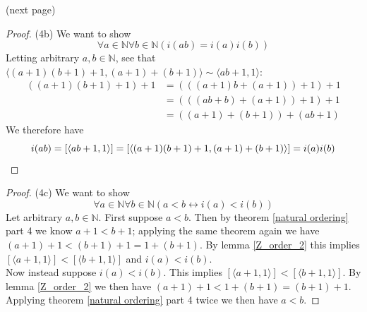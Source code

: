 \documentclass{report}
\begin{document}
\noindent(next page)\newpage
\begin{proof}(4b)
We want to show
\begin{equation*}
\forall a\in\mathbb N\forall b\in\mathbb N(i(ab)=i(a)i(b))
\end{equation*}
Letting arbitrary $a,b\in\mathbb N$,
see that $\langle(a+1)(b+1)+1,(a+1)+(b+1)\rangle\sim\langle ab+1,1\rangle$:
\begin{align*}
((a+1)(b+1)+1)+1&=(((a+1)b+(a+1))+1)+1\\
&=(((ab+b)+(a+1))+1)+1\\
&=((a+1)+(b+1))+(ab+1)
\end{align*}
We therefore have
\begin{equation*}
i(ab)=[\langle ab+1,1\rangle]=[\langle(a+1)(b+1)+1,(a+1)+(b+1)\rangle]=i(a)i(b)\qedhere
\end{equation*}
\end{proof}
\begin{proof}(4c)
We want to show
\begin{equation*}
\forall a\in\mathbb N\forall b\in\mathbb N(a<b\leftrightarrow i(a)<i(b))
\end{equation*}
Let arbitrary $a,b\in\mathbb N$. First suppose $a<b$. Then by theorem \ref{natural ordering} part 
4 we know $a+1<b+1$; applying the same theorem again we have $(a+1)+1<(b+1)+1=1+(b+1)$.
By lemma \ref{Z_order_2} this implies $[\langle a+1,1\rangle]<[\langle b+1,1\rangle]$
and $i(a)<i(b)$.\\
\indent Now instead suppose $i(a)<i(b)$. This implies $[\langle a+1,1\rangle]<[\langle b+1,1\rangle]$. By lemma \ref{Z_order_2} we then have
$(a+1)+1<1+(b+1)=(b+1)+1$. Applying theorem \ref{natural ordering} part 4 twice we then have $a<b$.
\end{proof}
\newpage
\end{document}

